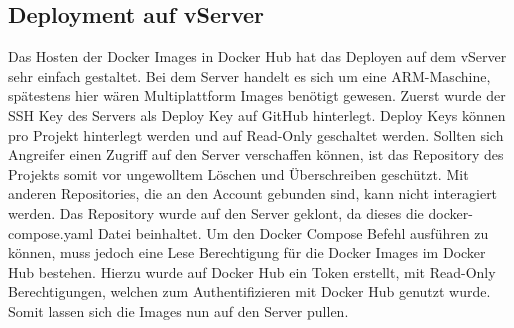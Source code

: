 \subsection{Deployment auf vServer}\label{subsec:deployment-auf-vserver}
Das Hosten der Docker Images in Docker Hub hat das Deployen auf dem vServer sehr einfach gestaltet.
Bei dem Server handelt es sich um eine ARM-Maschine, spätestens hier wären Multiplattform Images benötigt gewesen.
Zuerst wurde der SSH Key des Servers als Deploy Key auf GitHub hinterlegt.
Deploy Keys können pro Projekt hinterlegt werden und auf Read-Only geschaltet werden.
Sollten sich Angreifer einen Zugriff auf den Server verschaffen können, ist das Repository des Projekts somit vor ungewolltem Löschen und Überschreiben geschützt.
Mit anderen Repositories, die an den Account gebunden sind, kann nicht interagiert werden.
Das Repository wurde auf den Server geklont, da dieses die docker-compose.yaml Datei beinhaltet.
Um den Docker Compose Befehl ausführen zu können, muss jedoch eine Lese Berechtigung für die Docker Images im Docker Hub bestehen.
Hierzu wurde auf Docker Hub ein Token erstellt, mit Read-Only Berechtigungen, welchen zum Authentifizieren mit Docker Hub genutzt wurde.
Somit lassen sich die Images nun auf den Server pullen.

